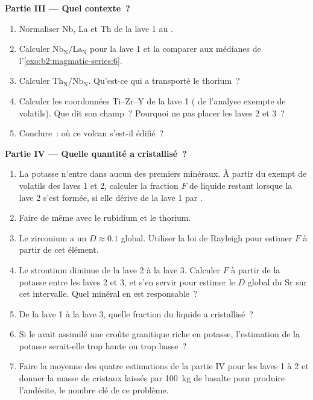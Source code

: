 \begin{problem}
\noindent\textbf{Partie III --- Quel contexte~?}
\begin{enumerate}[resume]
\item Normaliser Nb, La et Th de la lave 1 au .
\item Calculer $\mathrm{Nb_N}/\mathrm{La_N}$ pour la lave 1 et la comparer aux médianes
de l'\cref{exo:b2:magmatic-series:6}.
\item Calculer $\mathrm{Th_N}/\mathrm{Nb_N}$. Qu'est-ce qui a transporté le thorium~?
\item Calculer les coordonnées Ti--Zr--Y de la lave 1 ( de l'analyse exempte de
volatils). Que dit son champ~? Pourquoi ne pas placer les laves 2 et 3~?
\item Conclure~: où ce volcan s'est-il édifié~?
\end{enumerate}

\noindent\textbf{Partie IV --- Quelle quantité a cristallisé~?}
\begin{enumerate}[resume]
\item La potasse n'entre dans aucun des premiers minéraux. À partir du  exempt de
volatils des laves 1 et 2, calculer la fraction $F$ de liquide restant lorsque la lave 2 s'est formée, si elle
dérive de la lave 1 par .
\item Faire de même avec le rubidium et le thorium.
\item Le zirconium a un $D \approx 0.1$ global. Utiliser la loi de Rayleigh pour estimer $F$ à partir
de cet élément.
\item Le strontium diminue de la lave 2 à la lave 3. Calculer $F$ à partir de la potasse entre les laves 2 et
3, et s'en servir pour estimer le $D$ global du Sr sur cet intervalle. Quel minéral en est
responsable~?
\item De la lave 1 à la lave 3, quelle fraction du liquide a cristallisé~?
\item Si le  avait assimilé une croûte granitique riche en potasse, l'estimation de la potasse
serait-elle trop haute ou trop basse~?
\item Faire la moyenne des quatre estimations de la partie IV pour les laves 1 à 2 et donner la masse de
cristaux laissés par \qty{100}{kg} de basalte pour produire l'andésite, le nombre clé
de ce problème.
\end{enumerate}
\end{problem}
